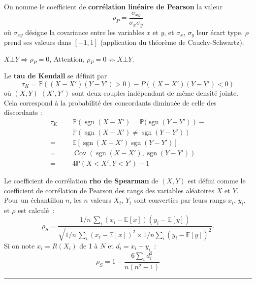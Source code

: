 \begin{f}

On nomme le coefficient de \textbf{corrélation linéaire de Pearson} la valeur
$$
\rho_P = \frac{\sigma_{xy}}{\sigma_x \sigma_y}
$$
où $\sigma_{xy}$ désigne la covariance entre les variables $x$ et $y$, et $\sigma_x$, $\sigma_y$ leur écart type.
$\rho$ prend ses valeurs dans $[-1,1]$ (application du théorème de Cauchy-Schwartz).

$X\bot Y \Rightarrow \rho_P=0$, Attention, $\rho_P=0 \nRightarrow X\bot Y $. 


 

Le \textbf{tau de Kendall} se définit par
$$
\tau_K=\mathbb{P}((X-X')(Y-Y')>0)-P((X-X')(Y-Y')<0)
$$
où $(X,Y)$  $(X',Y')$  sont deux couples indépendant de même densité jointe. Cela correspond à  la probabilité des concordants diminuée de celle des discordants :
\begin{align*}
\tau_K	=&\mathbb{P}\left(\operatorname{sgn}(X-X')=\mathbb{P}(\operatorname{sgn}(Y-Y')\right)-\\
		&\mathbb{P}\left(\operatorname{sgn}(X-X')\neq \operatorname{sgn}(Y-Y')\right)\\
=&\mathbb{E}\left[ \operatorname{sgn}(X-X')\operatorname{sgn}(Y-Y')\right]\\
=&\operatorname{Cov}(\operatorname{sgn}(X-X'),\operatorname{sgn}(Y-Y'))\\
=&4\mathbb{P}(X<X',Y<Y')-1 
\end{align*}

Le coefficient de corrélation \textbf{rho de Spearman} de $(X,Y)$ est défini comme le coefficient de corrélation de Pearson des rangs des variables aléatoires $X$ et $Y$.
Pour un échantillon $n$, les $n$ valeurs $X_i$, $Y_i$ sont converties par leurs rangs $x_i$, $y_i$, et $\rho$ est calculé~:
$$
\rho_S = \frac{1/n\,\sum_i(x_i-\mathbb{E}[x])(y_i-\mathbb{E}[y])}{\sqrt{1/n\,\sum_i (x_i-\mathbb{E}[x])^2 \times 1/n\sum_i(y_i-\mathbb{E}[y])^2}}.
$$
Si on note $x_i= R(X_i)$ de 1 à $N$ et  $d_i = x_i - y_i$~:
$$    \rho_S = 1- {\frac {6 \sum_i d_i^2}{n(n^2 - 1)}}$$

\end{f}
\hrule

